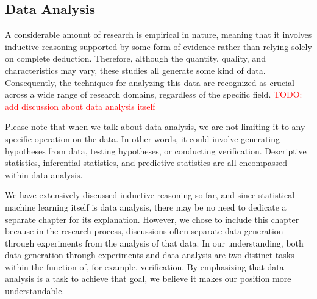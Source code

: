 \documentclass{book}
\begin{document}


\subsection{Data Analysis}
A considerable amount of research is empirical in nature, meaning that it involves inductive reasoning supported by some form of evidence rather than relying solely on complete deduction. Therefore, although the quantity, quality, and characteristics may vary, these studies all generate some kind of data. Consequently, the techniques for analyzing this data are recognized as crucial across a wide range of research domains, regardless of the specific field. \textcolor{red}{TODO: add discussion about data analysis itself}

Please note that when we talk about data analysis, we are not limiting it to any specific operation on the data. In other words, it could involve generating hypotheses from data, testing hypotheses, or conducting verification. Descriptive statistics, inferential statistics, and predictive statistics are all encompassed within data analysis.

We have extensively discussed inductive reasoning so far, and since statistical machine learning itself is data analysis, there may be no need to dedicate a separate chapter for its explanation. However, we chose to include this chapter because in the research process, discussions often separate data generation through experiments from the analysis of that data. In our understanding, both data generation through experiments and data analysis are two distinct tasks within the function of, for example, verification. By emphasizing that data analysis is a task to achieve that goal, we believe it makes our position more understandable. 
\end{document}
